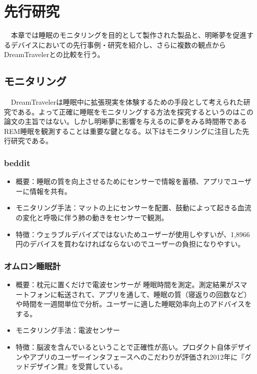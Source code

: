 \chapter{先行研究}
\label{chap:search}
　本章では睡眠のモニタリングを目的として製作された製品と、明晰夢を促進するデバイスにおいての先行事例・研究を紹介し、さらに複数の観点からDreamTravelerとの比較を行う。\\

\section{モニタリング}
　DreamTravelerは睡眠中に拡張現実を体験するための手段として考えられた研究である。よって正確に睡眠をモニタリングする方法を探究するというのはこの論文の主旨ではない。しかし明晰夢に影響を与えるのに夢をみる時間帯であるREM睡眠を観測することは重要な鍵となる。以下はモニタリングに注目した先行研究である。

\subsection{beddit}
\begin{itemize}
\item 概要：睡眠の質を向上させるためにセンサーで情報を蓄積、アプリでユーザーに情報を共有。
\item モニタリング手法：マットの上にセンサーを配置、鼓動によって起きる血流の変化と呼吸に伴う肺の動きをセンサーで観測。\cite{beddit}
\item 特徴：ウェラブルデバイズではないためユーザーが使用しやすいが、1,8966円のデバイスを買わなければならないのでユーザーの負担になりやすい。
\end{itemize}

\subsection{オムロン睡眠計}
\begin{itemize}
\item 概要：枕元に置くだけで電波センサーが 睡眠時間を測定。測定結果がスマートフォンに転送されて、アプリを通して、睡眠の質（寝返りの回数など）や時間を一週間単位で分析。ユーザーに適した睡眠効率向上のアドバイスをする。
\item モニタリング手法：電波センサー\cite{omron}
\item 特徴：脳波を含んでいるということで正確性が高い。プロダクト自体デザインやアプリのユーザーインタフェースへのこだわりが評価され2012年に『グッドデザイン賞』を受賞している。
\end{itemize}

